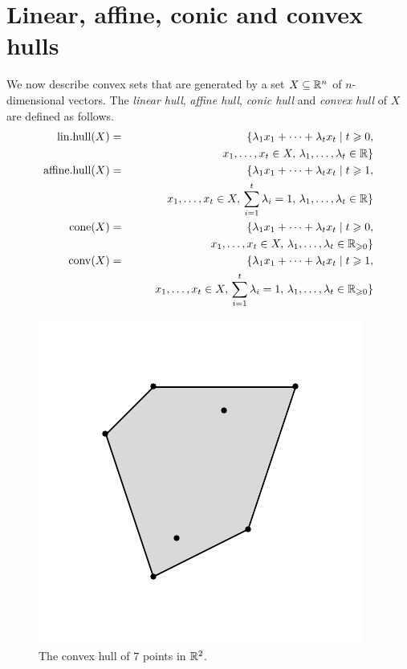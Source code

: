 \section{Linear, affine, conic  and convex hulls}
\label{conv:cha:linear-affine-convex}



We now describe convex sets that are generated by a set 
 $X\subseteq\mathbb{R}^n$  of $n$-dimensional
vectors. The \emph{linear hull}, \emph{affine hull}, \emph{conic hull} and \emph{convex
  hull} of $X$ are defined as follows.
\begin{eqnarray}
  \mathrm{lin.hull}(X) & = & \{ \lambda_1 x_1+ \cdots + \lambda_t x_t \mid t\geqslant0,  \label{conv:eq:2}\\
   & & \quad \quad  x_1,\ldots,x_t
  \in  X, \, \lambda_1,\ldots,\lambda_t\in \mathbb{R}\} \nonumber \\
  \mathrm{affine.hull}(X) & = & \{ \lambda_1 x_1+ \cdots + \lambda_t x_t \mid t\geqslant1, \label{conv:eq:4}\\
  & &   \quad \quad  x_1,\ldots,x_t \in  X, \, \sum_{i=1}^t \lambda_i = 1, \,
  \lambda_1,\ldots,\lambda_t\in \mathbb{R}\} \nonumber   \\ 
  \mathrm{cone}(X)  & = & \{ \lambda_1 x_1+ \cdots + \lambda_t x_t \mid t\geqslant0, \label{conv:eq:5} \\
  &&     \quad \quad  x_1,\ldots,x_t \in  X,  \, \lambda_1,\ldots,\lambda_t\in
  \mathbb{R}_{\geqslant0}\} \nonumber \\
  \operatorname{conv}(X) & = & \{ \lambda_1 x_1+ \cdots + \lambda_t x_t \mid t\geqslant1, \label{conv:eq:6} \\
  &&     \quad \quad  x_1,\ldots,x_t \in  X, \,  \sum_{i=1}^t \lambda_i = 1, \, \lambda_1,\ldots,\lambda_t\in
  \mathbb{R}_{\geqslant0}\} \nonumber 
\end{eqnarray}



\begin{figure}[htbp]
  \begin{center}
    \includegraphics{figures/picture1.pdf}    
  \end{center}
  \caption{The convex hull of $7$ points in $\mathbb{R}^2$. }\label{conv:fig:2}
\end{figure}


